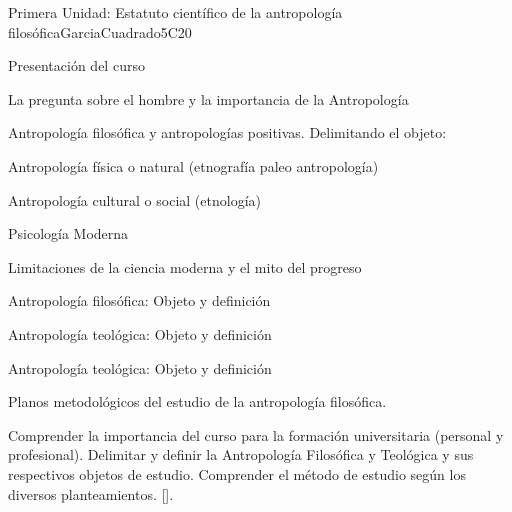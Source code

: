 \begin{syllabus}
\begin{unit}{}{Primera Unidad: Estatuto científico de la antropología filosófica}{GarciaCuadrado}{5}{C20}
\begin{topics}
	\item Presentación del curso
	\item La pregunta sobre el hombre y la importancia de la Antropología
	\item Antropología filosófica y antropologías positivas. Delimitando el objeto: 
	\begin{subtopics}
		\item Antropología física o natural (etnografía  paleo antropología)
		\item Antropología cultural o social (etnología)
		\item Psicología Moderna
		\item Limitaciones de la ciencia moderna y el mito del progreso
		\item Antropología filosófica: Objeto y definición
		\item Antropología teológica: Objeto y definición
		\item Antropología teológica: Objeto y definición	
	\end{subtopics}
	\item Planos metodológicos del estudio de la antropología filosófica. 
\end{topics}

\begin{learningoutcomes}
	\item Comprender la importancia del curso para la formación universitaria (personal y profesional).
Delimitar y definir la Antropología Filosófica y Teológica y sus respectivos objetos de estudio.
Comprender el método de estudio según los diversos planteamientos. [\Usage].

\end{learningoutcomes}
\end{unit}


\end{syllabus}
